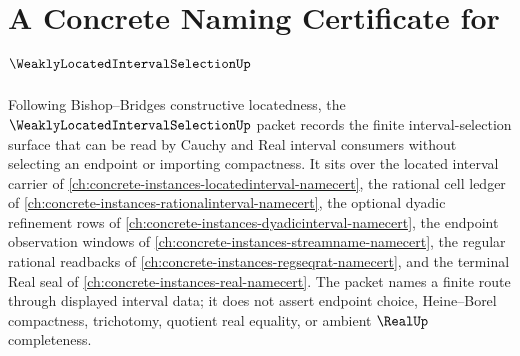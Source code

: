 \chapter{A Concrete Naming Certificate for $\WeaklyLocatedIntervalSelectionUp$}
\label{ch:concrete-instances-weakly-located-interval-selection-namecert}

Following Bishop--Bridges constructive locatedness, the $\WeaklyLocatedIntervalSelectionUp$ packet records the finite interval-selection surface that can be read by Cauchy and Real interval consumers without selecting an endpoint or importing compactness. It sits over the located interval carrier of \autoref{ch:concrete-instances-locatedinterval-namecert}, the rational cell ledger of \autoref{ch:concrete-instances-rationalinterval-namecert}, the optional dyadic refinement rows of \autoref{ch:concrete-instances-dyadicinterval-namecert}, the endpoint observation windows of \autoref{ch:concrete-instances-streamname-namecert}, the regular rational readbacks of \autoref{ch:concrete-instances-regseqrat-namecert}, and the terminal Real seal of \autoref{ch:concrete-instances-real-namecert}. The packet names a finite route through displayed interval data; it does not assert endpoint choice, Heine--Borel compactness, trichotomy, quotient real equality, or ambient $\RealUp$ completeness.

